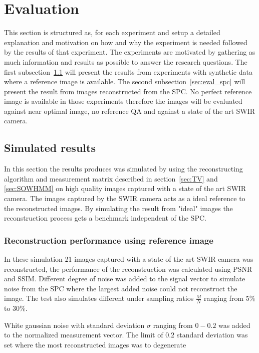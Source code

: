 \section{Evaluation}
\label{sec:Evaluation}
This section is structured as, for each experiment and setup a detailed explanation and motivation on how and why the experiment is needed followed by the results of that experiment. The experiments are motivated by gathering as much information and results as possible to answer the research questions. The first subsection~\ref{sec:simulated_results} will present the results from experiments with synthetic data where a reference image is available. The second subsection~\ref{sec:eval_spc} will present the result from images reconstructed from the SPC. No perfect reference image is available in those experiments therefore the images will be evaluated against near optimal image, no reference QA and against a state of the art SWIR camera. 



\subsection{Simulated results}
\label{sec:simulated_results}
In this section the results produces was simulated by using the reconstructing algorithm and measurement matrix described in section~\ref{sec:TV} and \ref{sec:SOWHMM} on high quality images captured with a state of the art SWIR camera. The images captured by the SWIR camera acts as a ideal reference to the reconstructed images. By simulating the result from "ideal" images the reconstruction process gets a benchmark independent of the SPC.


\subsubsection{Reconstruction performance using reference image}
\label{sec:reconstruction_performance}
In these simulation 21 images captured with a state of the art SWIR camera was reconstructed, the performance of the reconstruction was calculated using PSNR and SSIM. Different degree of noise was added to the signal vector to simulate noise from the SPC where the largest added noise could not reconstruct the image. The test also simulates different under sampling ratios $\frac{M}{N}$ ranging from 5\% to 30\%. 

White gaussian noise with standard deviation $\sigma$ ranging from $0-0.2$ was added to the normalized measurement vector. The limit of $0.2$ standard deviation was set where the most reconstructed images was to degenerate 

